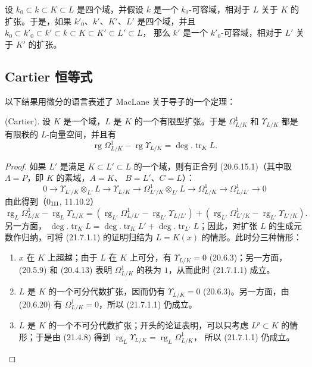 \begin{corollary}[21.6.6]
\label{0.21.6.6-fr}
设 $k_0\subset k\subset K\subset L$ 是四个域，并假设 $k$ 是一个
$k_0$-可容域，相对于 $L$ 关于 $K$ 的扩张。于是，如果 $k'_0$、$k'$、$K'$、$L'$
是四个域，并且
$k_0\subset k'_0\subset k'\subset k\subset K\subset K'\subset L'\subset L$，
那么 $k'$ 是一个 $k'_0$-可容域，相对于 $L'$ 关于 $K'$ 的扩张。
\end{corollary}

\subsection{Cartier 恒等式}
\label{subsection:0.21.7-fr}

以下结果用微分的语言表述了 MacLane 关于导子的一个定理：

\begin{theorem}[21.7.1]
\label{0.21.7.1-fr}
\textnormal{(Cartier).}
设 $K$ 是一个域，$L$ 是 $K$ 的一个有限型扩张。于是
$\Omega^1_{L/K}$ 和 $\Upsilon_{L/K}$ 都是有限秩的 $L$-向量空间，并且有
\begin{equation}
\tag{21.7.1.1}
\label{0.21.7.1.1-fr}
\operatorname{rg}\Omega^1_{L/K}-\operatorname{rg}\Upsilon_{L/K}
=\deg.\operatorname{tr}_K L.
\end{equation}
\end{theorem}

\begin{proof}
如果 $L'$ 是满足 $K\subset L'\subset L$ 的一个域，则有正合列
(20.6.15.1)（其中取 $\Lambda=P$，即 $K$ 的素域，$A=K$、
$B=L'$、$C=L$）：
\[
0\to\Upsilon_{L'/K}\otimes_{L'}L\to\Upsilon_{L/K}
\to\Omega^1_{L'/K}\otimes_{L'}L\to\Omega^1_{L/K}
\to\Omega^1_{L/L'}\to0
\]
由此得到（0$_{\rm III}$, 11.10.2）
\[
\operatorname{rg}_L\Omega^1_{L/K}-\operatorname{rg}_L\Upsilon_{L/K}
=(\operatorname{rg}_{L'}\Omega^1_{L/L'}-\operatorname{rg}_{L'}\Upsilon_{L/L'})
+(\operatorname{rg}_{L'}\Omega^1_{L'/K}-\operatorname{rg}_{L'}\Upsilon_{L'/K}).
\]
另一方面，
$\deg.\operatorname{tr}_K L=\deg.\operatorname{tr}_K L'
+\deg.\operatorname{tr}_{L'}L$；因此，对扩张 $L$ 的生成元数作归纳，可将
(21.7.1.1) 的证明归结为 $L=K(x)$ 的情形。此时分三种情形：
\begin{enumerate}
  \item[\rm a)] $x$ 在 $K$ 上超越；由于 $L$ 在 $K$ 上可分，有
  $\Upsilon_{L/K}=0$ (20.6.3)；另一方面，(20.5.9) 和 (20.4.13) 表明
  $\Omega^1_{L/K}$ 的秩为 $1$，从而此时 (21.7.1.1) 成立。
  \item[\rm b)] $L$ 是 $K$ 的一个可分代数扩张，因而仍有
  $\Upsilon_{L/K}=0$ (20.6.3)。另一方面，由 (20.6.20) 有
  $\Omega^1_{L/K}=0$，所以 (21.7.1.1) 仍成立。
  \item[\rm c)] $L$ 是 $K$ 的一个不可分代数扩张；开头的论证表明，可以只考虑
  $L^p\subset K$ 的情形；于是由 (21.4.8) 得到
  $\operatorname{rg}_L\Upsilon_{L/K}=\operatorname{rg}_L\Omega^1_{L/K}$，
  所以 (21.7.1.1) 仍成立。
\end{enumerate}
\end{proof}

